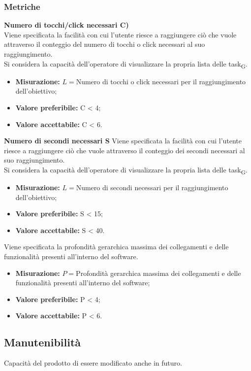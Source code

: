 \subsubsection{Metriche}
\textbf{Numero di tocchi/click necessari C)}\\
Viene specificata la facilità con cui l'utente riesce a raggiungere ciò che vuole attraverso il conteggio del numero di tocchi o click necessari al suo raggiungimento.\\
Si considera la capacità dell'operatore di visualizzare la propria lista delle \gls{task}\textsubscript{G}.
\begin{itemize}
	\item \textbf{Misurazione:} $L = $Numero di tocchi o click necessari per il raggiungimento dell'obiettivo;
	\item \textbf{Valore preferibile:} C < 4;
	\item \textbf{Valore accettabile:} C < 6.
\end{itemize}
\textbf{Numero di secondi necessari S}
Viene specificata la facilità con cui l'utente riesce a raggiungere ciò che vuole attraverso il conteggio dei secondi necessari al suo raggiungimento.\\
Si considera la capacità dell'operatore di visualizzare la propria lista delle \gls{task}\textsubscript{G}.
\begin{itemize}
	\item \textbf{Misurazione:} $L = $Numero di secondi necessari per il raggiungimento dell'obiettivo;
	\item \textbf{Valore preferibile:} S < 15;
	\item \textbf{Valore accettabile:} S < 40.
\end{itemize}
Viene specificata la profondità gerarchica massima dei collegamenti e delle funzionalità presenti all'interno del software.
\begin{itemize}
	\item \textbf{Misurazione:} $P = $Profondità gerarchica massima dei collegamenti e delle funzionalità presenti all'interno del software;
	\item \textbf{Valore preferibile:} P < 4;
	\item \textbf{Valore accettabile:} P < 6.
\end{itemize}
\subsection{Manutenibilità}
Capacità del prodotto di essere modificato anche in futuro.
